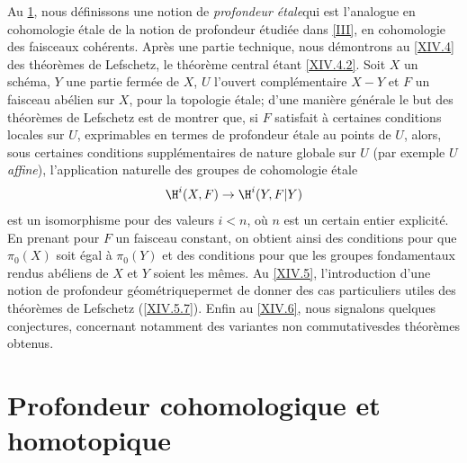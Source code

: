 \vspace*{1cm}
Au \numero \ref{XIV.1}, nous d\'efinissons une notion de \og \textit{profondeur étale}\fg qui est l'analogue en cohomologie \'etale de la notion de profondeur \'etudi\'ee dans \ref{III}, en cohomologie des faisceaux coh\'erents. Apr\`es une partie technique, nous d\'emontrons au \numero \ref{XIV.4} des \og th\'eor\`emes de Lefschetz\fg, le th\'eor\`eme central \'etant \ref{XIV.4.2}. Soit $X$ un sch\'ema, $Y$ une partie ferm\'ee de $X$, $U$ l'ouvert compl\'ementaire $X-Y$ et $F$ un faisceau ab\'elien sur $X$, pour la topologie \'etale; d'une mani\`ere g\'en\'erale le but des th\'eor\`emes de Lefschetz est de montrer que, si $F$ satisfait \`a certaines conditions locales sur $U$, exprimables en termes de profondeur \'etale au points de $U$, alors, sous certaines conditions suppl\'ementaires de nature globale sur $U$ (par exemple $U$ \textit{affine}), l'application naturelle des groupes de cohomologie \'etale
$$
\H^i(X, F)\to \H^i(Y, F{|Y})$$
est un isomorphisme pour des valeurs $i<n$, o\`u $n$ est un certain entier explicit\'e. En prenant pour $F$ un faisceau constant, on obtient ainsi des conditions pour que $\pi_0(X)$ soit \'egal \`a $\pi_0(Y)$ et des conditions pour que les groupes fondamentaux rendus ab\'eliens de $X$ et $Y$ soient les m\^emes. Au \numero \ref{XIV.5}, l'introduction d'une notion de \og profondeur g\'eom\'etrique\fg permet de donner des cas particuliers utiles des th\'eor\`emes de Lefschetz (\ref{XIV.5.7}). Enfin au \numero \ref{XIV.6}, nous signalons quelques conjectures, concernant notamment des variantes \og non commutatives\fg des th\'eor\`emes obtenus.

\section{Profondeur cohomologique et homotopique}\label{XIV.1}

\setcounter{subsection}{-1}

